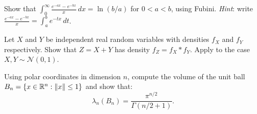 \begin{exercise}
Show that $\int_0^{\infty} \frac{e^{-ax} - e^{-bx}}{x}\, dx = \ln(b/a)$ for
$0 < a < b$, using Fubini.
\emph{Hint}: write $\frac{e^{-ax} - e^{-bx}}{x} = \int_a^b e^{-tx}\, dt$.
\end{exercise}

\begin{exercise}
Let $X$ and $Y$ be independent real random variables with densities $f_X$ and $f_Y$
respectively. Show that $Z = X + Y$ has density $f_Z = f_X * f_Y$. Apply to the case
$X, Y \sim \mathcal{N}(0,1)$.
\end{exercise}

\begin{exercise}
Using polar coordinates in dimension $n$, compute the volume of the unit ball
$B_n = \{x \in \mathbb{R}^n : \left\| x \right\| \leq 1\}$ and show that:
\[
    \lambda_n(B_n) = \frac{\pi^{n/2}}{\Gamma(n/2 + 1)}.
\]
\end{exercise}
